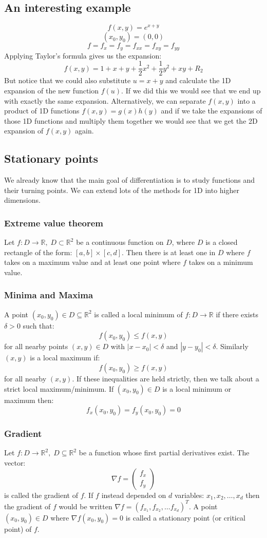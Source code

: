 \documentclass[12pt]{article}
\begin{document}
\subsection*{An interesting example}
\[f(x,y)=e^{x+y}\]
\[(x_0,y_0)=(0,0)\]
\[f=f_x=f_y=f_{xx}=f_{xy}=f_{yy}\]
Applying Taylor's formula gives us the expansion:
\[f(x,y)=1+x+y+\frac{1}{2}x^2+\frac{1}{2}y^2+xy+R_2\]
But notice that we could also substitute \(u=x+y\) and calculate the 1D expansion of the new function \(f(u)\). If we did this we would see that we end up with exactly the same expansion. Alternatively, we can separate \(f(x,y)\) into a product of 1D functions \(f(x,y)=g(x)h(y)\) and if we take the expansions of those 1D functions and multiply them together we would see that we get the 2D expansion of \(f(x,y)\) again.
\subsection*{Stationary points}
We already know that the main goal of differentiation is to study functions and their turning points. We can extend lots of the methods for 1D into higher dimensions.
\subsubsection*{Extreme value theorem}
Let \(f:D\to\mathbb{R},\;D\subset\mathbb{R}^2\) be a continuous function on \(D\), where \(D\) is a closed rectangle of the form: \([a,b]\times [c,d]\). Then there is at least one in \(D\) where \(f\) takes on a maximum value and at least one point where \(f\) takes on a minimum value.
\subsubsection*{Minima and Maxima}
A point \((x_0,y_0)\in D\subseteq\mathbb{R}^2\) is called a local minimum of \(f:D\to\mathbb{R}\) if there exists \(\delta>0\) such that:
\[f(x_0,y_0)\leq f(x,y)\]
for all nearby points \((x,y)\in D\) with \(|x-x_0|<\delta\) and \(|y-y_0|<\delta\). Similarly \((x,y)\) is a local maximum if:
\[f(x_0,y_0)\geq f(x,y)\]
for all nearby \((x,y)\). If these inequalities are held strictly, then we talk about a strict local maximum/minimum. If \((x_0,y_0)\in D\) is a local minimum or maximum then:
\[f_x(x_0,y_0)=f_y(x_0,y_0)=0\]
\subsubsection*{Gradient}
Let \(f:D\to \mathbb{R}^2,\;D\subseteq\mathbb{R}^2\) be a function whose first partial derivatives exist. The vector:
\[\nabla f=\begin{pmatrix}
    f_x \\
    f_y
\end{pmatrix}\]
is called the gradient of \(f\). If \(f\) instead depended on \(d\) variables: \(x_1,x_2,\dots,x_d\) then the gradient of \(f\) would be written \(\nabla f=(f_{x_1},f_{x_2},\dots f_{x_d})^T\). A point \((x_0,y_0)\in D\) where \(\nabla f(x_0,y_0)=0\) is called a stationary point (or critical point) of \(f\).
\end{document}
